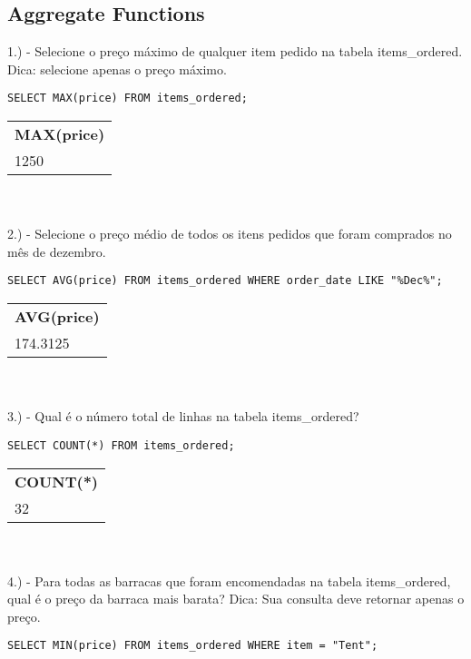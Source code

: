 \subsection{Aggregate Functions}

1.) - Selecione o preço máximo de qualquer item pedido na tabela items\_ordered. Dica: selecione apenas o preço máximo.

\begin{lstlisting}
SELECT MAX(price) FROM items_ordered;
\end{lstlisting}

\begin{tabular}{l}
    {\textbf{MAX(price)}}       \\
    {1250}
\end{tabular} \\ \\

2.) - Selecione o preço médio de todos os itens pedidos que foram comprados no mês de dezembro.

\begin{lstlisting}
SELECT AVG(price) FROM items_ordered WHERE order_date LIKE "%Dec%";
\end{lstlisting}

\begin{tabular}{l}
    {\textbf{AVG(price)}}       \\
    {174.3125}
\end{tabular} \\ \\

3.) - Qual é o número total de linhas na tabela items\_ordered?

\begin{lstlisting}
SELECT COUNT(*) FROM items_ordered;
\end{lstlisting}

\begin{tabular}{l}
    {\textbf{COUNT(*)}}       \\
    {32}
\end{tabular} \\ \\

4.) - Para todas as barracas que foram encomendadas na tabela items\_ordered, qual é o preço da barraca mais barata? Dica: Sua consulta deve retornar apenas o preço.

\begin{lstlisting}
SELECT MIN(price) FROM items_ordered WHERE item = "Tent";
\end{lstlisting}

